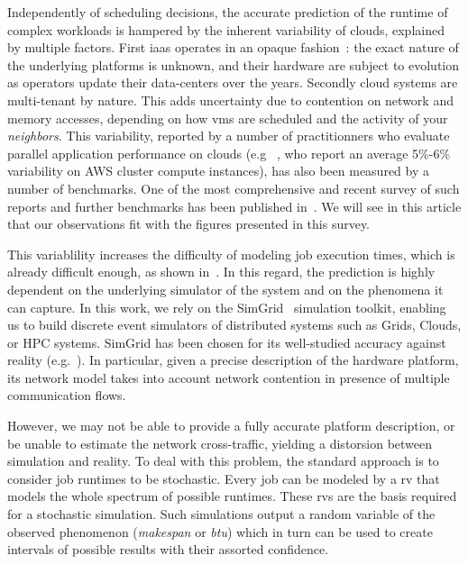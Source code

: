 \documentclass[10pt,conference,compsocconf]{IEEEtran}
\begin{document}
Independently of scheduling decisions, the accurate prediction of the runtime of
complex workloads is  hampered by the inherent variability  of clouds, explained
by multiple factors.  First \ac{iaas} operates  in an opaque fashion~: the exact
nature of the underlying platforms is unknown, and their hardware are subject to
evolution as operators update their data-centers over the years.  Secondly cloud
systems are multi-tenant  by nature. This adds uncertainty due  to contention on
network and  memory accesses, depending  on how  \acp{vm} are scheduled  and the
activity of  your \emph{neighbors}.  This  variability, reported by a  number of
practitionners  who evaluate  parallel  application performance  on clouds  (e.g
~\cite{MehrotraDHHJLSB16},  who report  an  average 5\%-6\%  variability on  AWS
cluster   compute  instances),   has  also   been  measured   by  a   number  of
benchmarks. One of the most comprehensive  and recent survey of such reports and
further benchmarks has been published in~\cite{LeitnerC16}. We will see in this 
article that our observations fit with the figures presented in this survey. 

This  variablility increases  the difficulty  of modeling  job execution  times,
which is  already difficult  enough, as  shown in~\cite{Lastovetsky05}.  In this
regard, the  prediction is highly dependent  on the underlying simulator  of the
system  and on  the phenomena  it can  capture.  In this  work, we  rely on  the
SimGrid~\cite{simgrid} simulation  toolkit, enabling us to  build discrete event
simulators of distributed systems such as Grids, Clouds, or HPC systems. SimGrid
has   been    chosen   for    its   well-studied   accuracy    against   reality
(e.g.~\cite{StanisicTLVM15,VelhoSCL13}).    In  particular,   given  a   precise
description  of the  hardware platform,  its  network model  takes into  account
network contention in presence of multiple communication flows.

However, we may not be able to provide a fully accurate platform description, or
be unable  to estimate  the network  cross-traffic, yielding  a distorsion  between
simulation and reality.  To deal with this problem, the  standard approach is to
consider job runtimes to  be stochastic.  Every job can be  modeled by a \ac{rv}
that models the whole spectrum of possible runtimes. These \acp{rv} are the basis
required for a stochastic simulation.  Such simulations output a random variable
of the  observed phenomenon (\emph{makespan}  or \emph{\ac{btu}}) which  in turn
can  be  used to  create  intervals  of  possible  results with  their  assorted
confidence.
\end{document}
